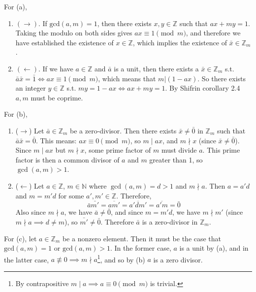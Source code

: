   \begin{solution}
    For (a), 
    \begin{enumerate}
      \item $(\rightarrow)$. If $\mathrm{gcd}(a, m) = 1$, then there exists $x, y \in \mathbb{Z}$ such that $ax + my = 1$. Taking the modulo on both sides gives $ax \equiv 1 \pmod{m}$, and therefore we have established the existence of $x \in \mathbb{Z}$, which implies the existence of $\bar{x} \in \mathbb{Z}_m$. 

      \item $(\leftarrow)$. If we have $a \in \mathbb{Z}$ and $\bar{a}$ is a unit, then there exists a $\bar{x} \in \mathbb{Z}_m$ s.t. $\bar{a} \bar{x} = \bar{1} \iff ax \equiv 1 \pmod{m}$, which means that $m | (1 - ax)$. So there exists an integer $y \in \mathbb{Z}$ s.t. $my = 1 - ax \iff ax + my = 1$. By Shifrin corollary 2.4 $a, m$ must be coprime. 
    \end{enumerate}

    For (b), 
    \begin{enumerate}
      \item ($\rightarrow$) Let $\bar{a} \in \mathbb{Z}_m$ be a zero-divisor. Then there exists $\bar{x} \neq \bar{0}$ in $\mathbb{Z}_m$ such that $\bar{a}\bar{x} = \bar{0}$. This means: $ax \equiv 0 \pmod{m}$, so $m \mid ax$, and  $m \nmid x$ (since $\bar{x} \neq \bar{0}$). Since $m \mid ax$ but $m \nmid x$, some prime factor of $m$ must divide $a$. This prime factor is then a common divisor of $a$ and $m$ greater than 1, so $\gcd(a,m) > 1$.

      \item ($\leftarrow$) Let $a \in \mathbb{Z}$, $m \in \mathbb{N}$ where $\gcd(a, m) = d > 1$ and $m \nmid a$. Then $a = a'd$ and $m = m'd$ for some $a', m' \in \mathbb{Z}$. Therefore, 
      \begin{equation}
        \bar{a} \bar{m'} = \overline{am'} = \overline{a'd m'} = \overline{a'm} = \bar{0}
      \end{equation}
      Also since $m \nmid a$, we have $\bar{a} \neq \bar{0}$, and since $m = m'd$, we have $m \nmid m'$ (since $m \nmid a \implies d \neq m$), so $\bar{m'} \neq \bar{0}$. Therefore $\bar{a}$ is a zero-divisor in $\mathbb{Z}_m$.
    \end{enumerate}

    For (c), let $a \in \mathbb{Z}_m$ be a nonzero element. Then it must be the case that $\mathrm{gcd}(a, m) = 1$ or $\mathrm{gcd}(a, m)  > 1$. In the former case, $a$ is a unit by (a), and in the latter case, $a \not\equiv 0 \implies m \nmid a$\footnote{By contrapositive $m \mid a \implies a \equiv 0 \pmod{m}$ is trivial.}, and so by (b) $a$ is a zero divisor. 
  \end{solution}

